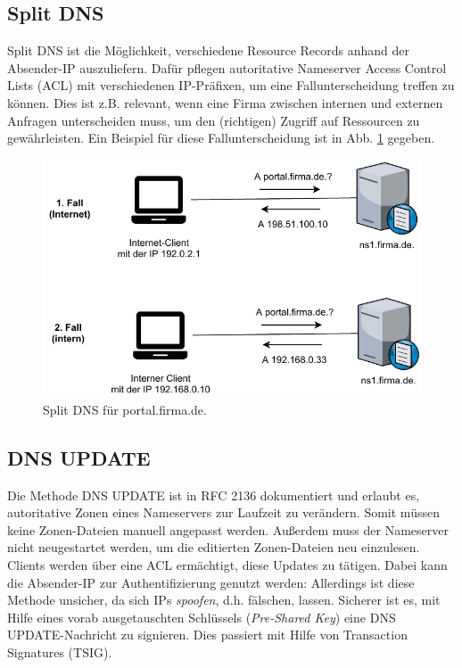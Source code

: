 \subsection{Split DNS}
Split \gls{DNS} ist die Möglichkeit, verschiedene Resource Records anhand der Absender-IP auszuliefern. Dafür pflegen autoritative Nameserver Access Control Lists (\gls{ACL}) mit verschiedenen IP-Präfixen, um eine Fallunterscheidung treffen zu können\cite[S.565-567]{Fall2011}. Dies ist z.B. relevant, wenn eine Firma zwischen internen und externen Anfragen unterscheiden muss, um den (richtigen) Zugriff auf Ressourcen zu gewährleisten. Ein Beispiel für diese Fallunterscheidung ist in Abb. \ref{grafik: split-dns} gegeben.

\begin{figure}[h]
  \centering
  \includegraphics{Figures/dns_split_view.pdf}
  \caption{Split DNS für portal.firma.de.}
  \label{grafik: split-dns}
\end{figure}\FloatBarrier

\subsection{DNS UPDATE}\label{dns-update}
Die Methode \gls{DNS} UPDATE ist in \gls{RFC} 2136 dokumentiert und erlaubt es, autoritative Zonen eines Nameservers zur Laufzeit zu verändern\cite{rfc2136}. Somit müssen keine Zonen-Dateien manuell angepasst werden. Außerdem muss der Nameserver nicht neugestartet werden, um die editierten Zonen-Dateien neu einzulesen.\\
\gls{Client}s werden über eine \gls{ACL} ermächtigt, diese Updates zu tätigen. Dabei kann die Absender-IP zur Authentifizierung genutzt werden: Allerdings ist diese Methode unsicher, da sich IPs \textit{spoofen}, d.h. fälschen, lassen\cite[S.70-71]{Fall2011}. Sicherer ist es, mit Hilfe eines vorab ausgetauschten Schlüssels (\textit{Pre-Shared Key}) eine \gls{DNS} UPDATE-Nachricht zu signieren. Dies passiert mit Hilfe von Transaction Signatures (\gls{TSIG})\cite[S.911-914]{Fall2011}.

